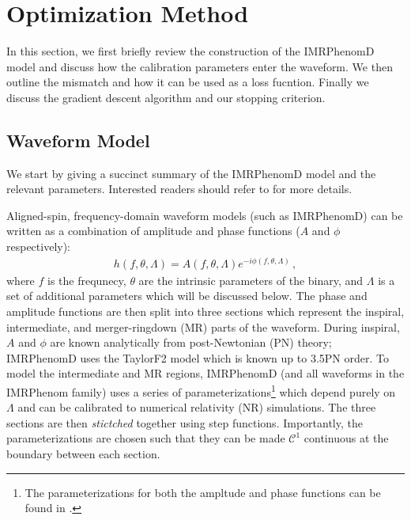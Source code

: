 \documentclass[twocolumn]{aastex631}
\begin{document}
\section{Optimization Method} \label{sec:method}

In this section, we first briefly review the construction of the IMRPhenomD model and discuss
how the calibration parameters enter the waveform.
We then outline the mismatch and how it can be used as a loss fucntion. 
Finally we discuss the gradient descent algorithm and our stopping criterion.

\subsection{Waveform Model} \label{subsec:waveform_model}

We start by giving a succinct summary of the IMRPhenomD model and the relevant parameters.
Interested readers should refer to \citep{khan2016frequency} for more details.

Aligned-spin, frequency-domain waveform models (such as IMRPhenomD) can be written as a
combination of amplitude and phase functions ($A$ and $\phi$ respectively):
\begin{align}\label{eq:}
	h(f,\theta,\Lambda) = A(f,\theta,\Lambda)e^{-i\phi(f,\theta,\Lambda)}\,,
\end{align}
where $f$ is the frequnecy, $\theta$ are the intrinsic parameters of the binary, and $\Lambda$ is a set of additional
parameters which will be discussed below. 
The phase and amplitude functions are then split into three sections which represent the
inspiral, intermediate, and merger-ringdown (MR) parts of the waveform. 
During inspiral, $A$ and $\phi$ are known analytically from post-Newtonian (PN) theory;
IMRPhenomD uses the TaylorF2 model \citep{Buonanno:2009zt, Arun:2004hn} which is known up to 3.5PN order.
To model the intermediate and MR regions, IMRPhenomD (and all waveforms in the IMRPhenom family)
uses a series of parameterizations\footnote{
	The parameterizations for both the ampltude and phase functions can be found in \citep{khan2016frequency}.
} 
which depend purely on $\Lambda$ and can be calibrated to numerical relativity (NR) simulations.
The three sections are then \textit{stictched} together using step functions.
Importantly, the parameterizations are chosen such that they can be made $\mathcal{C}^1$ continuous at the
boundary between each section.
\end{document}

